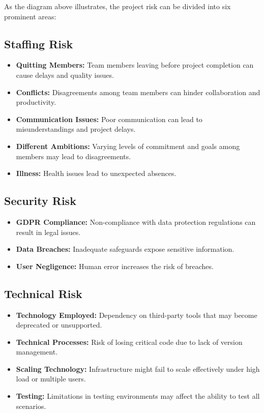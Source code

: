 \documentclass{article}
\begin{document}
As the diagram above illustrates, the project risk can be divided into six prominent areas:

\vspace{0.5cm}

\subsection{Staffing Risk}
\begin{itemize}
    \item \textbf{Quitting Members:} Team members leaving before project completion can cause delays and quality issues.
    \item \textbf{Conflicts:} Disagreements among team members can hinder collaboration and productivity.
    \item \textbf{Communication Issues:} Poor communication can lead to misunderstandings and project delays.
    \item \textbf{Different Ambitions:} Varying levels of commitment and goals among members may lead to disagreements.
    \item \textbf{Illness:} Health issues lead to unexpected absences.
\end{itemize}

\vspace{0.5cm}

\subsection{Security Risk}
\begin{itemize}
    \item \textbf{GDPR Compliance:} Non-compliance with data protection regulations can result in legal issues.
    \item \textbf{Data Breaches:} Inadequate safeguards expose sensitive information.
    \item \textbf{User Negligence:} Human error increases the risk of breaches.
\end{itemize}

\vspace{0.5cm}

\subsection{Technical Risk}
\begin{itemize}
    \item \textbf{Technology Employed:} Dependency on third-party tools that may become deprecated or unsupported.
    \item \textbf{Technical Processes:} Risk of losing critical code due to lack of version management.
    \item \textbf{Scaling Technology:} Infrastructure might fail to scale effectively under high load or multiple users.
    \item \textbf{Testing:} Limitations in testing environments may affect the ability to test all scenarios.
\end{itemize}
\end{document}
